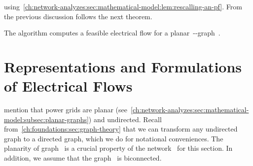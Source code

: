 using~\cref{ch:network-analyzes:sec:mathematical-model:lem:rescalling-an-pf}.
From the previous discussion follows the next theorem.
% 
\begin{theorem}
    The algorithm computes a feasible electrical flow for a
    planar~\source-\sink-graph~.
    \label{ch:network-analyzes:sec:mathematical-model:thm:algo-pf-1}
\end{theorem}
% 
% 
\section{Representations and Formulations of Electrical Flows}
\label{ch:network-analyzes:sec:representations}
% 
\textcite[p.13]{Cai12} mention that power grids are planar
(see~\cref{ch:network-analyzes:sec:mathematical-model:subsec:planar-graphs}) and
undirected. Recall from~\cref{ch:foundations:sec:graph-theory} that we can
transform any undirected graph to a directed graph, which we do for notational
conveniences. The planarity of graph~ is a crucial property of
the network~ for this section. In addition, we assume that
the graph~ is biconnected.
% 
